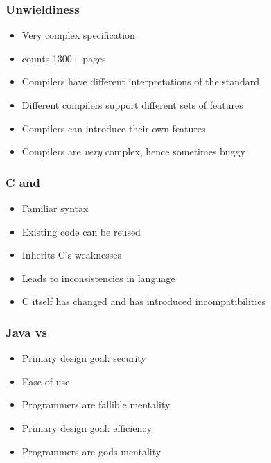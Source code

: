 \begin{frame}
  \frametitle{Unwieldiness}
  \begin{itemize}
    \item Very complex specification
    \item {}
          counts 1300+ pages
    \item Compilers have different interpretations of the standard
    \item Different compilers support different sets of features
    \item Compilers can introduce their own features
    \item Compilers are \emph{very} complex, hence sometimes buggy
  \end{itemize}
\end{frame}

\begin{frame}
  \frametitle{C and \cpp}
  \begin{itemize}
    \item Familiar syntax
    \item Existing code can be reused
  \end{itemize}
  \vskip5mm
  \begin{itemize}
    \item Inherits C's weaknesses
    \item Leads to inconsistencies in language
  \end{itemize}
  \vskip5mm
  \begin{itemize}
    \item C itself has changed and has introduced incompatibilities
  \end{itemize}
\end{frame}

\begin{frame}
  \frametitle{Java vs \cpp}
  \begin{itemize}
    \item Primary design goal: security
    \item Ease of use
    \item Programmers are fallible mentality
  \end{itemize}
  \vskip5mm
  \structure{\cpp}
  \begin{itemize}
    \item Primary design goal: efficiency
    \item Programmers are gods mentality
  \end{itemize}
\end{frame}

